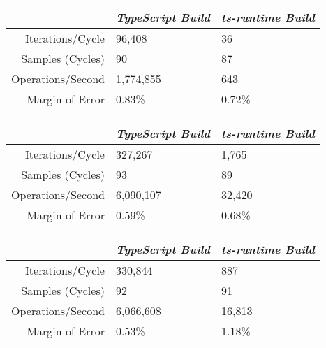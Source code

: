 \begin{center}
{
\centering
\tabulinesep=1.2mm
\setlength{\tabcolsep}{5mm}
\def\arraystretch{1.25}
\small
\begin{tabu} to \textwidth {|r||X[c,m]|X[c,m]|}
  \hline
  & \emph{TypeScript Build} & \emph{ts-runtime Build} \\
  \hline
  \hline
  Iterations/Cycle  & 96,408 & 36 \\
  \hline
  Samples (Cycles)  & 90 & 87 \\
  \hline
  Operations/Second & 1,774,855 & 643 \\
  \hline
  Margin of Error   & 0.83\% & 0.72\% \\
  \hline
\end{tabu}
}
\end{center}

\begin{center}
{
\centering
\tabulinesep=1.2mm
\setlength{\tabcolsep}{5mm}
\def\arraystretch{1.25}
\small
\begin{tabu} to \textwidth {|r||X[c,m]|X[c,m]|}
  \hline
  & \emph{TypeScript Build} & \emph{ts-runtime Build} \\
  \hline
  \hline
  Iterations/Cycle  & 327,267 & 1,765 \\
  \hline
  Samples (Cycles)  & 93 & 89 \\
  \hline
  Operations/Second & 6,090,107 & 32,420 \\
  \hline
  Margin of Error   & 0.59\% & 0.68\% \\
  \hline
\end{tabu}
}
\end{center}

\begin{center}
{
\centering
\tabulinesep=1.2mm
\setlength{\tabcolsep}{5mm}
\def\arraystretch{1.25}
\small
\begin{tabu} to \textwidth {|r||X[c,m]|X[c,m]|}
  \hline
  & \emph{TypeScript Build} & \emph{ts-runtime Build} \\
  \hline
  \hline
  Iterations/Cycle  & 330,844 & 887 \\
  \hline
  Samples (Cycles)  & 92 & 91 \\
  \hline
  Operations/Second & 6,066,608 & 16,813 \\
  \hline
  Margin of Error   & 0.53\% & 1.18\% \\
  \hline
\end{tabu}
}
\end{center}

